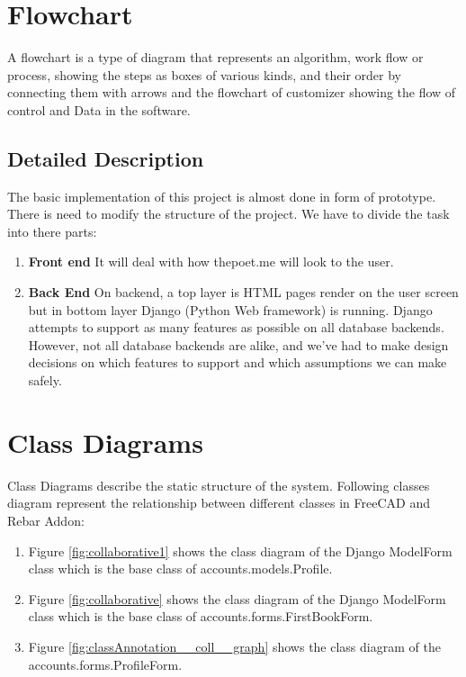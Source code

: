 \section{Flowchart}
A flowchart is a type of diagram that represents an algorithm, work flow or process, showing the steps as boxes of various kinds, and their order by connecting them with arrows and the flowchart of customizer showing the flow of control and Data in the software.

\subsection{Detailed Description}

The basic implementation of this project is almost done in form of prototype. There is need to modify the structure of the project. We have to divide the task into there parts:

\begin{enumerate}
	\item \textbf{Front end}
	It will deal with how thepoet.me will look to the user.
	
	\item \textbf{Back End}
	On backend, a top layer is HTML pages render on the user screen but in bottom layer Django (Python Web framework) is running. Django attempts to support as many features as possible on all database backends. However, not all database backends are alike, and we’ve had to make design decisions on which features to support and which assumptions we can make safely.  
	
\end{enumerate}


\section{Class Diagrams}
Class Diagrams describe the static structure of the system. Following classes diagram represent the relationship between different classes in FreeCAD and Rebar Addon:
\begin{enumerate}
	\item Figure \ref{fig:collaborative1} shows the class diagram of the Django ModelForm class which is the base class of accounts.models.Profile.

	\item Figure \ref{fig:collaborative} shows the class diagram of the Django ModelForm class which is the base class of accounts.forms.FirstBookForm.
	
	\item Figure \ref{fig:classAnnotation__coll__graph} shows the class diagram of the accounts.forms.ProfileForm.

\end{enumerate}

